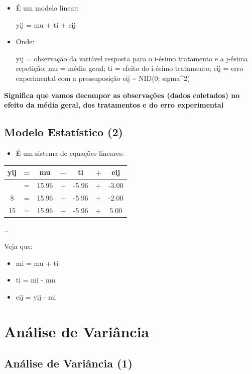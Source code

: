 \documentclass[
]{book}
\providecommand{\tightlist}{%
  \setlength{\itemsep}{0pt}\setlength{\parskip}{0pt}}
\begin{document}
\begin{itemize}
\item
  É um modelo linear:

  yij = mu + ti + eij
\item
  Onde:

  yij = observação da variável resposta para o i-ésimo tratamento e a j-ésima repetição;
  mu = média geral;
  ti = efeito do i-ésimo tratamento;
  eij = erro experimental com a pressuposição eij \textasciitilde{} NID(0; sigma\^{}2)
\end{itemize}

\textbf{Significa que vamos decompor as observações (dados coletados) no efeito da média geral, dos tratamentos e do erro experimental}

\subsection{Modelo Estatístico (2)}\label{modelo-estatuxedstico-2}

\begin{itemize}
\tightlist
\item
  É um sistema de equações lineares:
\end{itemize}

\begin{longtable}[]{@{}ccccccc@{}}
\toprule\noalign{}
yij & = & mu & + & ti & + & eij \\
\midrule\noalign{}
\endhead
\bottomrule\noalign{}
\endlastfoot
7 & = & 15.96 & + & -5.96 & + & -3.00 \\
8 & = & 15.96 & + & -5.96 & + & -2.00 \\
15 & = & 15.96 & + & -5.96 & + & 5.00 \\
\end{longtable}

\ldots{}

Veja que:

\begin{itemize}
\tightlist
\item
  mi = mu + ti
\item
  ti = mi - mu
\item
  eij = yij - mi
\end{itemize}

\section{Análise de Variância}\label{anuxe1lise-de-variuxe2ncia}

\subsection{Análise de Variância (1)}\label{anuxe1lise-de-variuxe2ncia-1}
\end{document}
